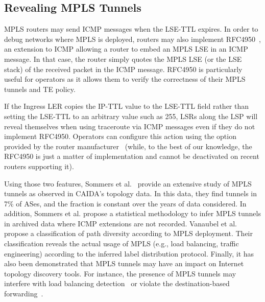 \subsection{Revealing MPLS Tunnels}\label{related.revealing}
MPLS routers may send ICMP \ttlexceeded messages when the LSE-TTL expires. In
order to debug networks where MPLS is deployed, routers may also implement
RFC4950~\cite{rfc4950}, an extension to ICMP allowing a router to embed an MPLS
LSE in an ICMP \ttlexceeded message. In that case, the router simply quotes the
MPLS LSE (or the LSE stack) of the received packet in the ICMP \ttlexceeded
message. RFC4950 is particularly useful for operators as it allows them to
verify the correctness of their MPLS tunnels and TE policy.

If the Ingress LER copies the IP-TTL value to the LSE-TTL field rather than
setting the LSE-TTL to an arbitrary value such as 255, LSRs along the LSP will
reveal themselves when using traceroute via ICMP messages even if they do not
implement RFC4950. Operators can configure this action using the \tpropagate
option provided by the router manufacturer~\cite{rfc3443} (while, to the best of
our knowledge, the RFC4950 is just a matter of implementation and cannot be
deactivated on recent routers supporting it). 

Using those two features, Sommers et al.~\cite{SOM11} provide an extensive study
of MPLS tunnels as observed in CAIDA's topology data.  In this data, they find
tunnels in 7\% of ASes, and the fraction is constant over the years of data
considered.  In addition, Sommers et al. propose a statistical methodology to
infer MPLS tunnels in archived data where ICMP extensions are not recorded.
Vanaubel et al.~\cite{Vanaubel15} propose a classification of path diversity
according to MPLS deployment.  Their classification reveals the actual usage of
MPLS (e.g., load balancing, traffic engineering) according to the inferred label
distribution protocol.  Finally, it has also been demonstrated that MPLS tunnels
may have an impact on Internet topology discovery tools.  For instance, the
presence of MPLS tunnels may interfere with load balancing
detection~\cite{BRICE07} or violate the destination-based
forwarding~\cite{Flach2012}.

